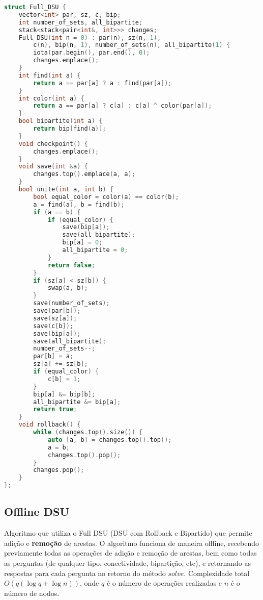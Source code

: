 \documentclass[11pt, a4paper, oneside]{book}
\begin{document}
\begin{multicols}{2}
\begin{lstlisting}[language=C++]
struct Full_DSU {
    vector<int> par, sz, c, bip;
    int number_of_sets, all_bipartite;
    stack<stack<pair<int&, int>>> changes;
    Full_DSU(int n = 0) : par(n), sz(n, 1),
        c(n), bip(n, 1), number_of_sets(n), all_bipartite(1) {
        iota(par.begin(), par.end(), 0);
        changes.emplace();
    }
    int find(int a) {
        return a == par[a] ? a : find(par[a]);
    }
    int color(int a) {
        return a == par[a] ? c[a] : c[a] ^ color(par[a]);
    }
    bool bipartite(int a) {
        return bip[find(a)];
    }
    void checkpoint() {
        changes.emplace();
    }
    void save(int &a) {
        changes.top().emplace(a, a);
    }
    bool unite(int a, int b) {
        bool equal_color = color(a) == color(b);
        a = find(a), b = find(b);
        if (a == b) {
            if (equal_color) {
                save(bip[a]);
                save(all_bipartite);
                bip[a] = 0;
                all_bipartite = 0;
            }
            return false;
        }
        if (sz[a] < sz[b]) {
            swap(a, b);
        }
        save(number_of_sets);
        save(par[b]);
        save(sz[a]);
        save(c[b]);
        save(bip[a]);
        save(all_bipartite);
        number_of_sets--;
        par[b] = a;
        sz[a] += sz[b];
        if (equal_color) {
            c[b] = 1;
        }
        bip[a] &= bip[b];
        all_bipartite &= bip[a];
        return true;
    }
    void rollback() {
        while (changes.top().size()) {
            auto [a, b] = changes.top().top();
            a = b;
            changes.top().pop();
        }
        changes.pop();
    }
};\end{lstlisting}
\end{multicols}

\hfill

\subsection{Offline DSU}


Algoritmo que utiliza o Full DSU (DSU com Rollback e Bipartido) que permite adição e \textbf{remoção} de arestas. O algoritmo funciona de maneira offline, recebendo previamente todas as operações de adição e remoção de arestas, bem como todas as perguntas (de qualquer tipo, conectividade, bipartição, etc), e retornando as respostas para cada pergunta no retorno do método $solve$. Complexidade total $O(q (\log q + \log n))$, onde $q$ é o número de operações realizadas e $n$ é o número de nodos.
\hfill
\end{document}
